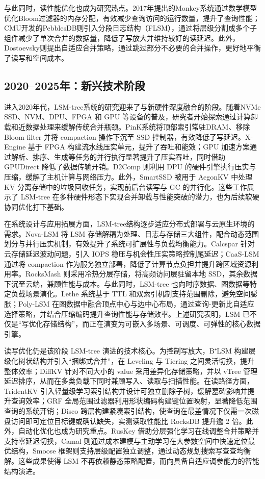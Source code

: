 \documentclass[lang=cn,11pt,a4paper]{elegantpaper}
\begin{document}
与此同时，读性能优化也成为研究热点。2017年提出的Monkey系统通过数学模型优化Bloom过滤器的内存分配，有效减少查询访问的运行数量，提升了查询性能；CMU开发的PebblesDB则引入分段日志结构（FLSM），通过将层级分割成多个子组件减少了单次合并的数据量，降低了写放大并维持较好的读延迟。此外，Dostoevsky则提出自适应合并策略，通过跳过部分不必要的合并操作，更好地平衡了读写和空间成本。


\subsection{2020–2025年：新兴技术阶段}
进入2020年代，LSM-tree系统的研究迎来了与新硬件深度融合的阶段。随着NVMe SSD、NVM、DPU、FPGA 和 GPU 等设备的普及，研究者开始探索通过计算卸载和近数据处理来缓解传统合并瓶颈。PinK系统将顶部索引常驻DRAM、移除 Bloom filter 并将 compaction 操作下沉至 SSD 控制器，有效降低了写延迟。X-Engine 基于 FPGA 构建流水线压实单元，提升了吞吐和能效；GPU 加速方案通过解析、排序、生成等任务的并行执行显著提升了压实吞吐，同时借助 GPUDirect 降低了数据传输开销。D2Comp 则利用 DPU 的硬件引擎执行压实与压缩，缓解了主机计算与网络压力。此外，SmartSSD 被用于 AegonKV 中处理 KV 分离存储中的垃圾回收任务，实现前后台读写与 GC 的并行化。这些工作展示了 LSM-tree 在多种硬件形态下实现合并卸载与性能突破的潜力，也为后续软硬协同优化打下基础。

在系统设计与应用拓展方面，LSM-tree结构逐步适应分布式部署与云原生环境的需求。Nova-LSM 将 LSM 存储解耦为处理、日志与存储三大组件，配合动态范围划分与并行压实机制，有效提升了系统可扩展性与负载均衡能力。Calcspar 针对云存储延迟波动问题，引入 IOPS 稳压与机会性压实策略控制尾延迟；CaaS-LSM 通过将 compaction 作为服务独立部署，降低了计算节点负担并提升跨区域资源利用率。RocksMash 则采用冷热分层存储，将高频访问层驻留本地 SSD，其余数据下沉至云端，兼顾性能与成本。与此同时，LSM-tree 也向时序数据、图数据等特定负载场景演化。Lethe 系统基于 TTL 和双索引机制支持范围删除，避免空间膨胀；Poly-LSM 在图数据中融合顶点中心与边中心布局，通过查询-更新比自适应选择策略，并结合压缩编码提升查询性能与存储效率。上述研究表明，LSM 已不仅是“写优化存储结构”，而正在演变为可嵌入多场景、可调度、可弹性的核心数据引擎。

读写优化仍是该阶段 LSM-tree 演进的技术核心。为控制写放大，B⁺LSM 构建层级化树状结构并引入“捆绑式合并”，在 Leveling 与 Tiering 之间灵活切换，提升整体效率；DiffKV 针对不同大小的 value 采用差异化存储策略，并以 vTree 管理延迟排序，从而在多类负载下同时兼顾写入、读取与扫描性能。在读路径方面，TridentKV 引入轻量级学习索引结构并设计可独立删除子树，缓解墓碑影响并提升查询效率；GRF 全局范围过滤器利用形状编码构建键位置映射，显著降低范围查询的系统开销；Disco 跨层构建紧凑索引结构，使查询在最差情况下仅需一次磁盘访问即可定位目标键或确认缺失，实测读取性能比 RocksDB 提升逾 2 倍。此外，自动化优化也成为研究重点。RusKey 借助分层强化学习在线调整合并策略并支持零延迟切换，Camal 则通过成本建模与主动学习在大参数空间中快速定位最优结构，Smoose 框架则支持层级配置独立调整，通过动态规划搜索写查查均衡解。这些成果使得 LSM 不再依赖静态策略配置，而向具备自适应调参能力的智能结构演进。
\end{document}
